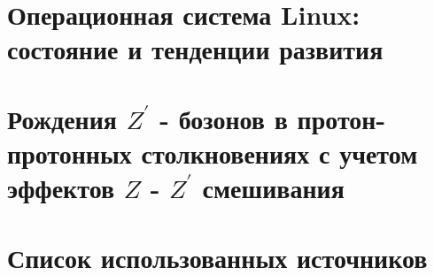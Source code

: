 \documentclass[12pt,a4paper]{styles/report}
\begin{document}


\newpage
\pagestyle{plain}  \setcounter{page}{2}
\large \tableofcontents

%

\chapter{Операционная система Linux: состояние и тенденции развития}






\chapter{Рождения $Z^\prime$ - бозонов в протон-протонных столкновениях с учетом эффектов $Z$ - $Z^\prime$ смешивания}




\chapter{Список использованных источников}
\begin{thebibliography}{9999.}



\end{thebibliography}
\end{document}
